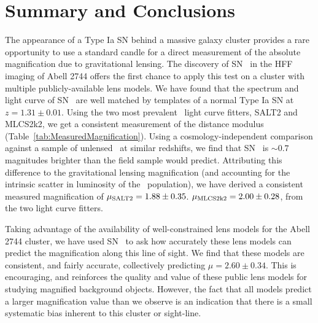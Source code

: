 
\section{Summary and Conclusions}
\label{sec:SummaryAndConclusions}

The appearance of a Type Ia SN behind a massive galaxy cluster
provides a rare opportunity to use a standard candle for a direct
measurement of the absolute magnification due to gravitational
lensing.  The discovery of SN \tomas\ in the HFF imaging of Abell 2744
offers the first chance to apply this test on a cluster with multiple
publicly-available lens models.  We have found that the spectrum and
light curve of SN \tomas\ are well matched by templates of a normal
Type Ia SN at $z=1.31\pm0.01$.  Using the two most prevalent \SNIa\
light curve fitters, SALT2 and MLCS2k2, we get a consistent
measurement of the distance modulus
(Table~\ref{tab:MeasuredMagnification}).  Using a
cosmology-independent comparison against a sample of unlensed \SNeIa\
at similar redshifts, we find that SN \tomas\ is $\sim0.7$ magnitudes
brighter than the field sample would predict.  Attributing this
difference to the gravitational lensing magnification (and accounting
for the intrinsic scatter in luminosity of the \SNIa\ population), we
have derived a consistent measured magnification of $\mu_{\rm
SALT2}=1.88\pm0.35$.  $\mu_{\rm MLCS2k2}=2.00\pm0.28$, from the two
light curve fitters.

Taking advantage of the availability of  well-constrained lens
models for the Abell 2744 cluster, we have used SN \tomas\ to ask
how accurately these lens models can predict the magnification along
this line of sight.   We find that these models are consistent, and
fairly accurate, collectively predicting $\mu=2.60\pm0.34$.  This is
encouraging, and reinforces the quality and value of these public lens
models for studying magnified background objects.   However, the fact
that all models predict a larger magnification value than we observe
is an indication that there is a small systematic bias inherent to
this cluster or sight-line. 


